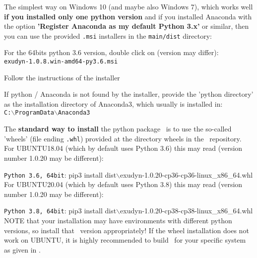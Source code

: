 The simplest way on Windows 10 (and maybe also Windows 7), which works well {\bf if you installed only one python version} and if you installed Anaconda with the option {\bf 'Register Anaconda as my default Python 3.x'} or similar, then you can use the provided \texttt{.msi} installers in the \texttt{main/dist} directory:
\bi
  \item For the 64bits python 3.6 version, double click on (version may differ):\\ \texttt{exudyn-1.0.8.win-amd64-py3.6.msi}
	\item Follow the instructions of the installer
	\item If python / Anaconda is not found by the installer, provide the 'python directory' as the installation directory of Anaconda3, which usually is installed in:\\
	\texttt{C:$\backslash$ProgramData$\backslash$Anaconda3}
\ei

The {\bf standard way to install} the python package \codeName\ is to use the so-called 'wheels' (file ending \texttt{.whl}) provided at the directory wheels in the \codeName\ repository. 
\vspace{6pt}\\
For UBUNTU18.04 (which by default uses Python 3.6) this may read (version number 1.0.20 may be different):
\bi
  \item \texttt{Python 3.6, 64bit}: pip3 install dist$\backslash$exudyn-1.0.20-cp36-cp36-linux\_x86\_64.whl
\ei
For UBUNTU20.04 (which by default uses Python 3.8) this may read (version number 1.0.20 may be different):
\bi
  \item \texttt{Python 3.8, 64bit}: pip3 install dist$\backslash$exudyn-1.0.20-cp38-cp38-linux\_x86\_64.whl
\ei
NOTE that your installation may have environments with different python versions, so install that \codeName\ version appropriately!
If the wheel installation does not work on UBUNTU, it is highly recommended to build \codeName\ for your specific system as given in .

